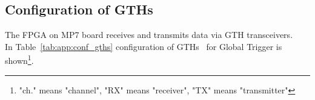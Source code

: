 \clearpage
\clearpage
\subsection{Configuration of GTHs}\label{sec:app:app_a}

The FPGA on MP7 board receives and transmits data via GTH transceivers.\\
In Table~\ref{tab:app:conf_gths} configuration of GTHs~\cite{GTHs} for Global Trigger is shown\footnote{"ch." means "channel", "RX" means "receiver", "TX" means "transmitter"}.


